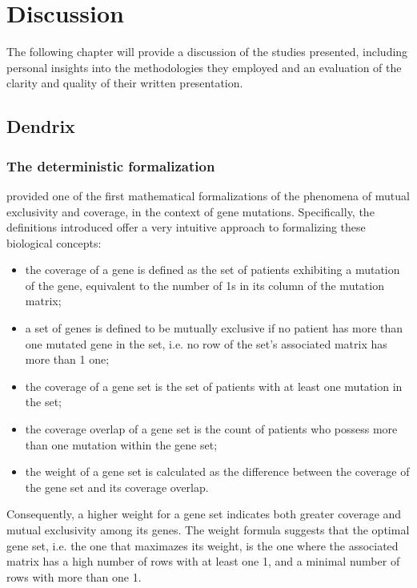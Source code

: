 \chapter{Discussion} \label{chap:discussion}

The following chapter will provide a discussion of the studies presented, including personal insights into the methodologies they employed and an evaluation of the clarity and quality of their written presentation. 

\section{Dendrix}

\subsection{The deterministic formalization}

\textcite{dendrix} provided one of the first mathematical formalizations of the phenomena of mutual exclusivity and coverage, in the context of gene mutations. Specifically, the definitions introduced offer a very intuitive approach to formalizing these biological concepts:

\begin{itemize}
    \item the coverage of a gene is defined as the set of patients exhibiting a mutation of the gene, equivalent to the number of 1s in its column of the mutation matrix;
    \item a set of genes is defined to be mutually exclusive if no patient has more than one mutated gene in the set, i.e. no row of the set's associated matrix has more than 1 one;
    \item the coverage of a gene set is the set of patients with at least one mutation in the set;
    \item the coverage overlap of a gene set is the count of patients who possess more than one mutation within the gene set;
    \item the weight of a gene set is calculated as the difference between the coverage of the gene set and its coverage overlap.
\end{itemize}

Consequently, a higher weight for a gene set indicates both greater coverage and mutual exclusivity among its genes. The weight formula suggests that the optimal gene set, i.e. the one that maximazes its weight, is the one where the associated matrix has a high number of rows with at least one 1, and a minimal number of rows with more than one 1.


